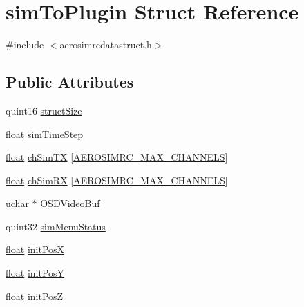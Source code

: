 \hypertarget{structsim_to_plugin}{\section{sim\-To\-Plugin Struct Reference}
\label{structsim_to_plugin}
}


{\ttfamily \#include $<$aerosimrcdatastruct.\-h$>$}

\subsection*{Public Attributes}
\begin{DoxyCompactItemize}
\item 
quint16 \hyperlink{group___aero_sim_r_c_gab277fde5232c4a8c41adcdcc1dc7199f}{struct\-Size}
\item 
\hyperlink{_super_l_u_support_8h_a6a1bb6ed41f44b60e7bd83b0e9945aa7}{float} \hyperlink{group___aero_sim_r_c_ga58a610591c7eb9b7e1f32208e4cb343c}{sim\-Time\-Step}
\item 
\hyperlink{_super_l_u_support_8h_a6a1bb6ed41f44b60e7bd83b0e9945aa7}{float} \hyperlink{group___aero_sim_r_c_gae5ff2433affe60bce670d0c6bf66ee06}{ch\-Sim\-T\-X} \mbox{[}\hyperlink{group___aero_sim_r_c_ga63f989ac10cdcbfefadc5e65055d3c7d}{A\-E\-R\-O\-S\-I\-M\-R\-C\-\_\-\-M\-A\-X\-\_\-\-C\-H\-A\-N\-N\-E\-L\-S}\mbox{]}
\item 
\hyperlink{_super_l_u_support_8h_a6a1bb6ed41f44b60e7bd83b0e9945aa7}{float} \hyperlink{group___aero_sim_r_c_gadefc3aa551adb807da0171a7a92f73ee}{ch\-Sim\-R\-X} \mbox{[}\hyperlink{group___aero_sim_r_c_ga63f989ac10cdcbfefadc5e65055d3c7d}{A\-E\-R\-O\-S\-I\-M\-R\-C\-\_\-\-M\-A\-X\-\_\-\-C\-H\-A\-N\-N\-E\-L\-S}\mbox{]}
\item 
uchar $\ast$ \hyperlink{group___aero_sim_r_c_gadc2b5a377a36c5f5d2dfae169880bb1c}{O\-S\-D\-Video\-Buf}
\item 
quint32 \hyperlink{group___aero_sim_r_c_ga1cc3af651b3f3382357e9a882abc64d4}{sim\-Menu\-Status}
\item 
\hyperlink{_super_l_u_support_8h_a6a1bb6ed41f44b60e7bd83b0e9945aa7}{float} \hyperlink{group___aero_sim_r_c_ga23ae6e8ef17ad84cc500793e730df894}{init\-Pos\-X}
\item 
\hyperlink{_super_l_u_support_8h_a6a1bb6ed41f44b60e7bd83b0e9945aa7}{float} \hyperlink{group___aero_sim_r_c_gacb4ac6e2ad9d5f215153b9fea05b66bf}{init\-Pos\-Y}
\item 
\hyperlink{_super_l_u_support_8h_a6a1bb6ed41f44b60e7bd83b0e9945aa7}{float} \hyperlink{group___aero_sim_r_c_ga020dda7446e3217a8c779458a74feec8}{init\-Pos\-Z}

\end{DoxyCompactItemize}
